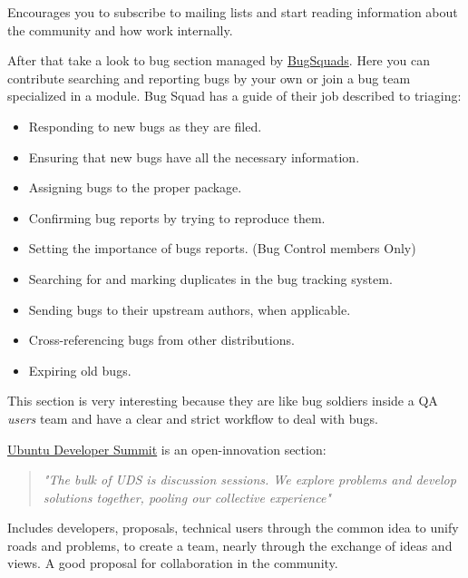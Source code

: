 \par Encourages you to subscribe to mailing lists and start reading information about the community and how work internally.

\par After that take a look to bug section managed by \href{https://wiki.ubuntu.com/BugSquad}{BugSquads}. Here you can contribute searching and reporting bugs by your own or join a bug team specialized in a module. Bug Squad has a guide of their job described to triaging:

\begin{itemize}
	\item Responding to new bugs as they are filed.
	\item Ensuring that new bugs have all the necessary information.
	\item Assigning bugs to the proper package.
	\item Confirming bug reports by trying to reproduce them.
	\item Setting the importance of bugs reports. (Bug Control members Only)
	\item Searching for and marking duplicates in the bug tracking system.
	\item Sending bugs to their upstream authors, when applicable.
	\item Cross-referencing bugs from other distributions.
	\item Expiring old bugs.
\end{itemize} This section is very interesting because they are like bug soldiers inside a QA \textit{users} team and have a clear and strict workflow to deal with bugs.

\par \href{http://uds.ubuntu.com/}{Ubuntu Developer Summit} is an open-innovation section:

\begin{quote}
    \par \textit{"The bulk of UDS is discussion sessions. We explore problems and develop solutions together, pooling our collective experience"}
\end{quote}

\par Includes developers, proposals, technical users through the common idea to unify roads and problems, to create a team, nearly through the exchange of ideas and views. A good proposal for collaboration in the community.


